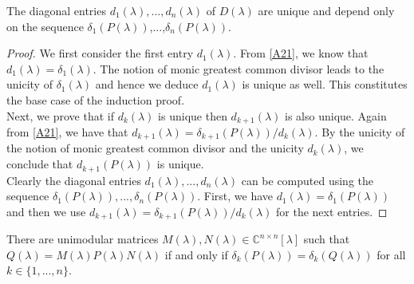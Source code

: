 \documentclass[11pt]{article}
\newcommand{\complex}{\mathbb{C}} %
\begin{document}
The diagonal entries $d_1(\lambda),...,d_n(\lambda)$ of $D(\lambda)$ are unique and depend only on the sequence $\delta_1(P(\lambda))$,...,$\delta_n(P(\lambda))$.
\begin{proof}
We first consider the first entry $d_1(\lambda)$. From \eqref{A21}, we know that $d_1(\lambda)=\delta_1(\lambda)$. The notion of monic greatest common divisor leads to the unicity of $\delta_1(\lambda)$ and hence we deduce $d_1(\lambda)$ is unique as well. This constitutes the base case of the induction proof.\\
Next, we prove that if $d_k(\lambda)$ is unique then $d_{k+1}(\lambda)$ is also unique. Again from \eqref{A21}, we have that $d_{k+1}(\lambda)=\delta_{k+1}(P(\lambda))/d_k(\lambda)$. By the unicity of the notion of monic greatest common divisor and the unicity $d_k(\lambda)$, we conclude that $d_{k+1}(P(\lambda))$ is unique.\\
Clearly the diagonal entries $d_1(\lambda),...,d_n(\lambda)$ can be computed using the sequence $\delta_1(P(\lambda)),...,\delta_n(P(\lambda))$. First, we have $d_1(\lambda)=\delta_1(P(\lambda))$ and then we use $d_{k+1}(\lambda)=\delta_{k+1}(P(\lambda))/ d_k(\lambda)$ for the next entries.
\end{proof}
There are unimodular matrices $M(\lambda),N(\lambda)\in\complex^{n\times n}[\lambda]$ such that $Q(\lambda)=M(\lambda)P(\lambda)N(\lambda)$ if and only if $\delta_k(P(\lambda))=\delta_k(Q(\lambda))$ for all $k\in\{1,...,n\}$.
\end{document}
